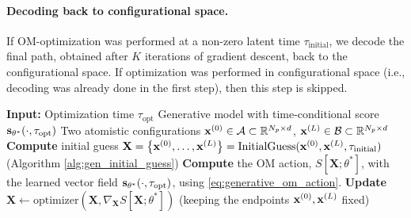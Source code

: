 \paragraph{Decoding back to configurational space.}
If OM-optimization was performed at a non-zero latent time $\tau_{\text{initial}}$, we decode the final path, obtained after $K$ iterations of gradient descent, back to the configurational space. If optimization was performed in configurational space (i.e., decoding was already done in the first step), then this step is skipped.
\begin{algorithm}[t]
\caption{Onsager-Machlup Transition Path Optimization with Generative Models}
\begin{algorithmic}[1]
\label{alg:om_optimization}
    \STATE \textbf{Input:}
    \STATE Optimization time $\tau_{\text{opt}}$
    \STATE Generative model with time-conditional score $\mathbf{s}_{\theta^*}(\cdot, \tau_\text{opt})$
    \STATE Two atomistic configurations $\mathbf{x}^{(0)} \in \mathcal{A} \subset \mathbb{R}^{N_p \times d}$, $\mathbf{x}^{(L)} \in \mathcal{B} \subset \mathbb{R}^{N_p \times d}$
    \STATE \textbf{Compute} initial guess $\mathbf{X} = \left \{\mathbf{x}^{(0)},\dots,\mathbf{x}^{(L)} \right \} = \text{InitialGuess}(\mathbf{x}^{(0)}, \mathbf{x}^{(L)}, \tau_{\text{initial}})$ (Algorithm \ref{alg:gen_initial_guess})
        \STATE \textbf{Compute} the OM action, $S[\mathbf{X}; \theta^*]$, with the learned vector field $\mathbf{s}_{\theta^*}(\cdot, \tau_{\text{opt}})$, using \eqref{eq:generative_om_action}.
        \STATE \textbf{Update} $\mathbf{X} \leftarrow \text{optimizer}(\mathbf{X}, \nabla_\mathbf{X} S[\mathbf{X}; \theta^*])$ (keeping the endpoints $\mathbf{x}^{(0)}, \mathbf{x}^{(L)}$ fixed)
    \ENDWHILE
\end{algorithmic}
\end{algorithm}